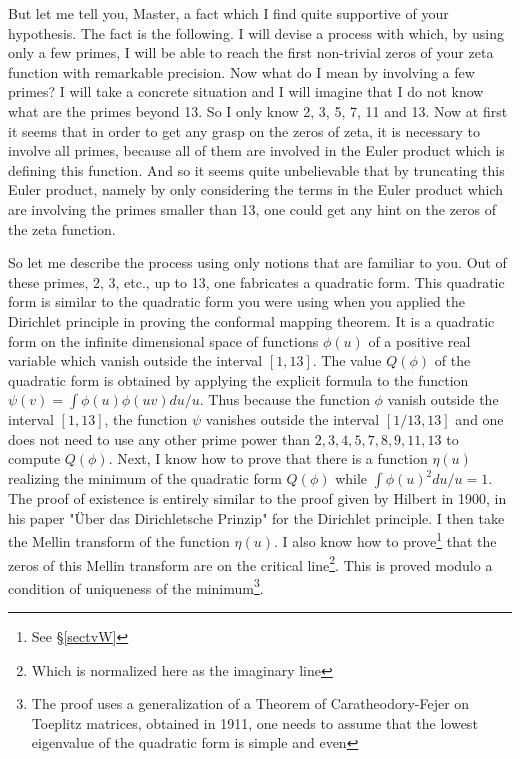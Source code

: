 \documentclass{article}
\begin{document}
\begin{large}
 \medskip
 
But  let me tell you, Master, a fact which I find quite supportive of your hypothesis. The fact is the following. I will  devise a process with which, by using only a few primes, I will be able to reach the first non-trivial zeros of your zeta function with remarkable precision. Now what do I mean by involving a few primes? I will take a concrete situation and I will imagine that I do not know what are the primes beyond 13. So I only know 2, 3, 5, 7, 11 and 13. Now at first it seems that in order to get any grasp on the zeros of zeta, it is necessary to involve all primes, because all of them are involved in the Euler product which is defining this function. And so it seems quite unbelievable that by truncating this Euler product, namely by only considering the terms in the Euler product which are involving the primes smaller than 13, one could get any hint on the zeros of the zeta function.

   
 \medskip
 


 So let me describe the process using only notions that are familiar to you. Out of these primes, 2, 3, etc., up to 13, one fabricates a quadratic form. This quadratic form  is similar to the quadratic form you were using when you applied the Dirichlet principle in proving the conformal mapping theorem. It is a quadratic form  on the infinite dimensional space of functions $\phi(u)$ of a positive real variable which vanish outside the interval $[1,13]$.  The value $Q(\phi)$ of the quadratic form  is obtained  by applying the explicit formula to the function $\psi(v)=\int \phi(u)\phi(uv)du/u$. Thus because the function $\phi$ vanish outside the interval $[1,13]$, the function $\psi$ vanishes outside the interval $[1/13,13]$ and one does not need  to use any other prime power than $2,3,4,5,7,8,9,11,13$ to compute $Q(\phi)$. Next, I know how to prove that there is a function $\eta(u)$ realizing the minimum of the quadratic form $Q(\phi)$ while $\int \phi(u)^2du/u=1$. The proof of existence is entirely similar to the proof given by Hilbert in 1900, in his paper "Über das Dirichletsche Prinzip" for the Dirichlet principle. I then take the Mellin transform of the function $\eta(u)$. I also know how to prove\footnote{See \S \ref{sectvW}}
 that  the zeros of this Mellin transform are on the critical line\footnote{Which is normalized here as the imaginary line}. This is proved modulo a  condition of uniqueness of the minimum\footnote{The proof uses a generalization of a Theorem of Caratheodory-Fejer on Toeplitz matrices, obtained in 1911, one needs to assume that the lowest eigenvalue of the quadratic form is simple and even}. 
 

\end{large}
\end{document}

